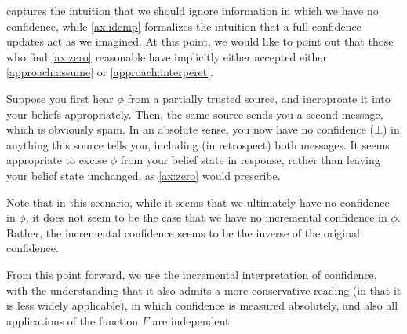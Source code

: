 \documentclass{article}
\def\confdom{\mathdcal C}
\begin{document}
 captures the intuition that we should ignore information in which we have no confidence, while \cref{ax:idemp} formalizes the intuition that a full-confidence updates act as we imagined.
At this point, we would like to point out that those who find \cref{ax:zero} reasonable have implicitly either accepted either \cref{approach:assume} or \cref{approach:interperet}.

\begin{example}
	Suppose you first hear $\phi$ from a partially trusted source, and incroproate it into your beliefs appropriately.  
	Then, the same source sends you a second message, which is obviously spam.
	In an absolute sense, you now have no confidence ($\bot$) in anything this source tells you, including (in retrospect) both messages. 
	It seems appropriate to excise $\phi$ from your belief state in response, rather than leaving your belief state unchanged, as \cref{ax:zero} would prescribe. 

	Note that in this scenario, while it seems that we ultimately have no confidence in $\phi$, it does not seem to be the case that we have no incremental confidence in $\phi$.  
	Rather, the incremental confidence seems to be the inverse of the original confidence.  
\end{example}

From this point forward, we use the incremental interpretation of confidence, with the understanding that it also admits a more conservative reading (in that it is less widely applicable), in which confidence is measured absolutely, and also all applications of the function $F$ are independent. 


\end{document}

